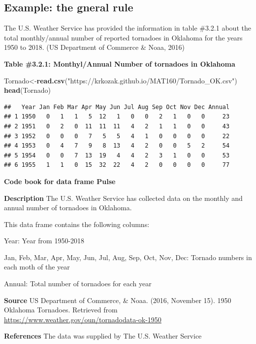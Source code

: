 \documentclass[
]{book}
\newenvironment{Shaded}{\begin{snugshade}}{\end{snugshade}}
\newcommand{\KeywordTok}[1]{\textcolor[rgb]{0.13,0.29,0.53}{\textbf{#1}}}
\newcommand{\NormalTok}[1]{#1}
\newcommand{\StringTok}[1]{\textcolor[rgb]{0.31,0.60,0.02}{#1}}
\begin{document}
\hypertarget{example-the-gneral-rule}{%
\subsection{Example: the gneral rule}\label{example-the-gneral-rule}}

The U.S. Weather Service has provided the information in table \#3.2.1 about the total monthly/annual number of reported tornadoes in Oklahoma for the years 1950 to 2018. (US Department of Commerce \& Noaa, 2016)

\textbf{Table \#3.2.1: Monthyl/Annual Number of tornadoes in Oklahoma}

\begin{Shaded}
\begin{Highlighting}[]
\NormalTok{Tornado<-}\KeywordTok{read.csv}\NormalTok{(}\StringTok{"https://krkozak.github.io/MAT160/Tornado_OK.csv"}\NormalTok{)}
\KeywordTok{head}\NormalTok{(Tornado)}
\end{Highlighting}
\end{Shaded}

\begin{verbatim}
##   Year Jan Feb Mar Apr May Jun Jul Aug Sep Oct Nov Dec Annual
## 1 1950   0   1   1   5  12   1   0   0   2   1   0   0     23
## 2 1951   0   2   0  11  11  11   4   2   1   1   0   0     43
## 3 1952   0   0   0   7   5   5   4   1   0   0   0   0     22
## 4 1953   0   4   7   9   8  13   4   2   0   0   5   2     54
## 5 1954   0   0   7  13  19   4   4   2   3   1   0   0     53
## 6 1955   1   1   0  15  32  22   4   2   0   0   0   0     77
\end{verbatim}

\textbf{Code book for data frame Pulse}

\textbf{Description}
The U.S. Weather Service has collected data on the monthly and annual number of tornadoes in Oklahoma.

This data frame contains the following columns:

Year: Year from 1950-2018

Jan, Feb, Mar, Apr, May, Jun, Jul, Aug, Sep, Oct, Nov, Dec: Tornado numbers in each moth of the year

Annual: Total number of tornadoes for each year

\textbf{Source}
US Department of Commerce, \& Noaa. (2016, November 15). 1950 Oklahoma Tornadoes. Retrieved from \url{https://www.weather.gov/oun/tornadodata-ok-1950}

\textbf{References}
The data was supplied by The U.S. Weather Service
\end{document}
